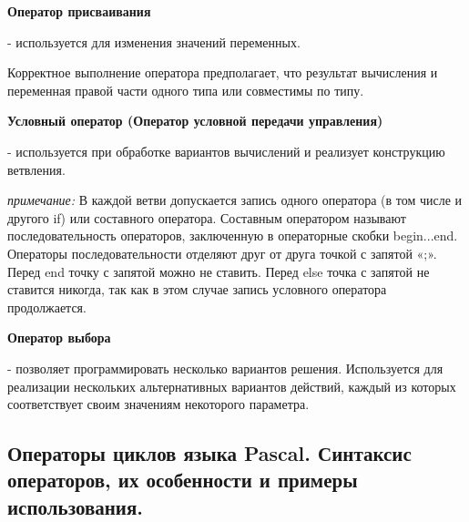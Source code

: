 \begin{myquote}
        
\end{myquote}

{\bf{Оператор присваивания}}

- используется для изменения значений переменных.

Корректное выполнение оператора предполагает, что результат вычисления и переменная правой части одного типа или совместимы по типу.


{\bf{Условный оператор (Оператор условной передачи управления)}}

- используется при обработке вариантов вычислений и реализует конструкцию ветвления.


{\textit{примечание:}}
В каждой ветви допускается запись одного оператора (в том числе и другого if) или составного оператора. 
Составным оператором называют последовательность 
операторов, заключенную в операторные скобки begin...end. Операторы последовательности отделяют друг от друга точкой с запятой «;». Перед end 
точку с запятой можно не ставить. Перед else точка с запятой не ставится 
никогда, так как в этом случае запись условного оператора продолжается.

{\bf{Оператор выбора}}

- позволяет программировать несколько вариантов решения. Используется для реализации нескольких альтернативных вариантов действий, каждый из которых соответствует своим значениям некоторого параметра.







\newpage\subsection{Операторы циклов языка Pascal. Синтаксис операторов, их особенности и примеры использования. }

\begin{myquote}
        
\end{myquote}

